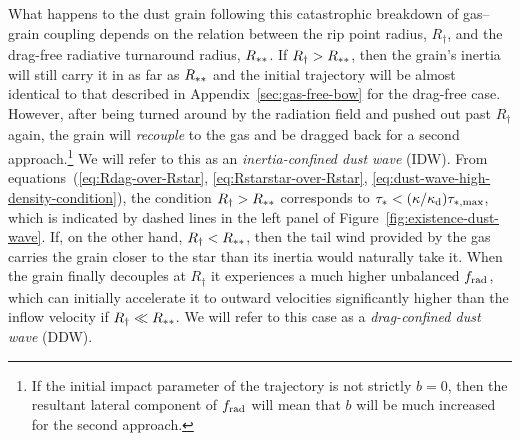 What happens to the dust grain following this catastrophic breakdown
of gas--grain coupling depends on the relation between the rip point
radius, \(R_\dag\), and the drag-free radiative turnaround radius,
\(R_{**}\).  If \(R_\dag > R_{**}\), then the grain's inertia
will still carry it in as far as \(R_{**}\) and the initial
trajectory will be almost identical to that described in
Appendix~\ref{sec:gas-free-bow} for the drag-free case. However, after
being turned around by the radiation field and pushed out past
\(R_\dag\) again, the grain will \emph{recouple} to the gas and be
dragged back for a second approach.\footnote{If the initial impact
  parameter of the trajectory is not strictly \(b = 0\), then the
  resultant lateral component of \(f_{\text{rad}}\) will mean that \(b\) will
  be much increased for the second approach.} %
We will refer to this as an \textit{inertia-confined dust wave}
(IDW).  From equations~(\ref{eq:Rdag-over-Rstar},
\ref{eq:Rstarstar-over-Rstar},
\ref{eq:dust-wave-high-density-condition}), the condition
\(R_\dag > R_{**}\) corresponds to
\(\tau_* < (\kappa/\kappa_{\text{d}}) \tau_{*,\text{max}}\), which is indicated by dashed
lines in the left panel of Figure~\ref{fig:existence-dust-wave}.  If,
on the other hand, \(R_\dag < R_{**}\), then the tail wind provided
by the gas carries the grain closer to the star than its inertia would
naturally take it.  When the grain finally decouples at \(R_\dag\) it
experiences a much higher unbalanced \(f_{\text{rad}}\), which can initially
accelerate it to outward velocities significantly higher than the
inflow velocity if \(R_\dag \ll R_{**}\).  We will refer to this case
as a \textit{drag-confined dust wave} (DDW).


